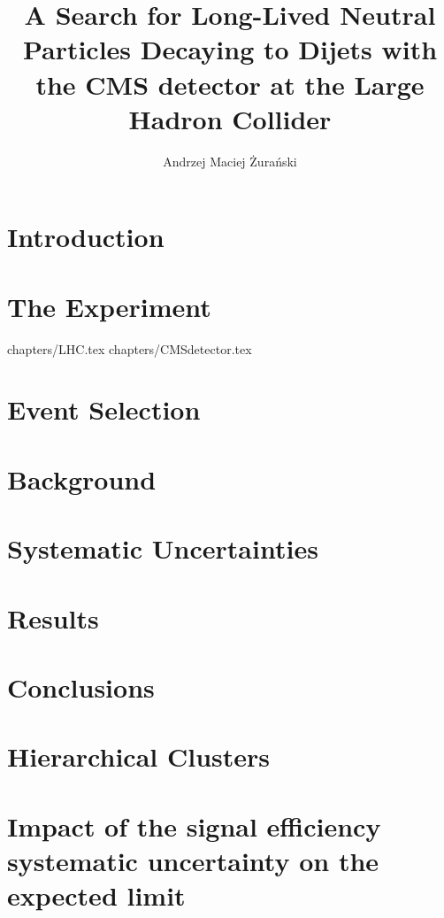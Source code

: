 \documentclass[phd,black]{PrincetonThesis}
\title{A Search for Long-Lived Neutral Particles Decaying to Dijets with the CMS detector at the
Large Hadron Collider}
\author{Andrzej Maciej \.Zura\'nski}
\begin{document}
\begin{frontmatter}
  \begin{thesisabstract}
    
  \end{thesisabstract}
  \begin{acknowledgements}
    
  \end{acknowledgements}
\end{frontmatter}


\chapter{Introduction}
\label{chap:intro}


\chapter{The Experiment}
\label{chap:cmslhc}
 {chapters/LHC.tex}
 {chapters/CMSdetector.tex}

\chapter{Event Selection}
\label{chap:selection}
 
 

\chapter{Background}


\chapter{Systematic Uncertainties}


\chapter{Results}


\chapter{Conclusions}
%


\appendix
\chapter{Hierarchical Clusters}

\chapter{Impact of the signal efficiency systematic uncertainty on the expected limit}

\cleardoublepage 
\end{document}
